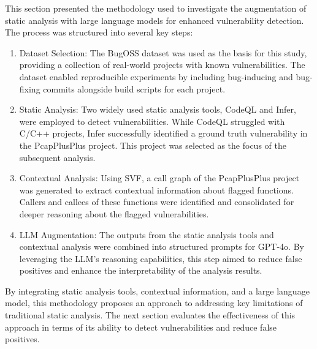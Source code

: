 This section presented the methodology used to investigate the augmentation of static analysis with large language models for enhanced vulnerability detection. The process was structured into several key steps:
\begin{enumerate}
    \item Dataset Selection: The BugOSS dataset was used as the basis for this study, providing a collection of real-world projects with known vulnerabilities. The dataset enabled reproducible experiments by including bug-inducing and bug-fixing commits alongside build scripts for each project.
    \item Static Analysis: Two widely used static analysis tools, CodeQL and Infer, were employed to detect vulnerabilities. While CodeQL struggled with C/C++ projects, Infer successfully identified a ground truth vulnerability in the PcapPlusPlus project. This project was selected as the focus of the subsequent analysis.
    \item Contextual Analysis: Using SVF, a call graph of the PcapPlusPlus project was generated to extract contextual information about flagged functions. Callers and callees of these functions were identified and consolidated for deeper reasoning about the flagged vulnerabilities.
    \item LLM Augmentation: The outputs from the static analysis tools and contextual analysis were combined into structured prompts for GPT-4o. By leveraging the LLM's reasoning capabilities, this step aimed to reduce false positives and enhance the interpretability of the analysis results.
\end{enumerate}

By integrating static analysis tools, contextual information, and a large language model, this methodology proposes an approach to addressing key limitations of traditional static analysis. The next section evaluates the effectiveness of this approach in terms of its ability to detect vulnerabilities and reduce false positives.
